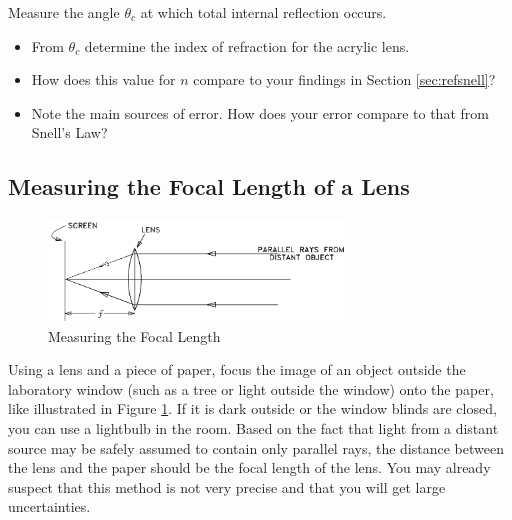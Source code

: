 Measure the angle $\theta_{c}$ at which total internal reflection occurs.
\begin{itemize}
    \item   	From $\theta_{c}$ determine the index of refraction for the acrylic lens.
    \item	How does this value for $n$ compare to your findings in Section \ref{sec:refsnell}?
    \item   	Note the main sources of error.  How does your error compare to that from Snell's Law?
\end{itemize}

\myskip

\subsection{Measuring the Focal Length of a Lens}
\label{sec:lengthI}
\begin{figure}[h]
\centering
\includegraphics[width=0.7\textwidth]{./Exp6/pic/image8.png}
\caption{Measuring the Focal Length}
\label{fig:focusedray}
\end{figure} 
Using a lens and a piece of paper, focus the image of an object outside the laboratory window (such as a tree or light outside the window) onto the paper, like illustrated in Figure \ref{fig:focusedray}.  If it is dark outside or the window blinds are closed, you can use a lightbulb in the room. Based on the fact that light from a distant source may be safely assumed to contain only parallel rays, the distance between the lens and the paper should be the focal length of the lens. You may already suspect that this method is not very precise and that you will get large uncertainties.

